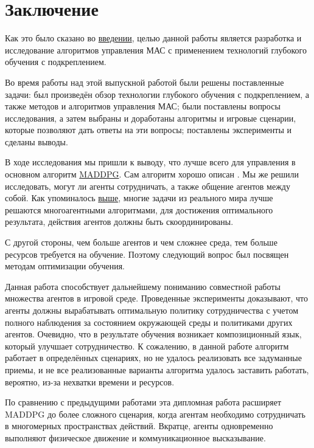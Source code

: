 \chapter*{Заключение} \label{ch-conclusion}

Как это было сказано во \hyperref[intro]{введении}, целью данной работы является разработка и исследование алгоритмов управления МАС с применением технологий глубокого обучения с подкреплением. 

Во время работы над этой выпускной работой были решены поставленные задачи: был произведён обзор технологии глубокого обучения с подкреплением, а также методов и алгоритмов управления МАС; были поставлены вопросы исследования, а затем выбраны и доработаны алгоритмы и игровые сценарии, которые позволяют дать ответы на эти вопросы; поставлены эксперименты и сделаны выводы.

В ходе исследования мы пришли к выводу, что лучше всего для управления в основном алгоритм \hyperref[acr:maddpg]{MADDPG}. Сам алгоритм хорошо описан \cite{lowe2017multiagent}. Мы же решили исследовать, могут ли агенты сотрудничать, а также общение агентов между собой. Как упоминалось \hyperref[ch2:ma-algs]{выше}, многие задачи из реального мира лучше решаются многоагентными алгоритмами, для достижения оптимального результата, действия агентов должны быть скоординированы.

С другой стороны, чем больше агентов и чем сложнее среда, тем больше ресурсов требуется на обучение. Поэтому следующий вопрос был посвящен методам оптимизации обучения.

Данная работа способствует дальнейшему пониманию совместной работы множества агентов в игровой среде. Проведенные эксперименты доказывают, что агенты должны вырабатывать оптимальную политику сотрудничества с учетом полного наблюдения за состоянием окружающей среды и политиками других агентов. Очевидно, что в результате обучения возникает композиционный язык, который улучшает сотрудничество. К сожалению, в данной работе алгоритм работает в определённых сценариях, но не удалось реализовать все задуманные приемы, и не все реализованные варианты алгоритма удалось заставить работать, вероятно, из-за нехватки времени и ресурсов.

По сравнению с предыдущими работами эта дипломная работа расширяет MADDPG до более сложного сценария, когда агентам необходимо сотрудничать в многомерных пространствах действий. Вкратце, агенты одновременно выполняют физическое движение и коммуникационное высказывание.

